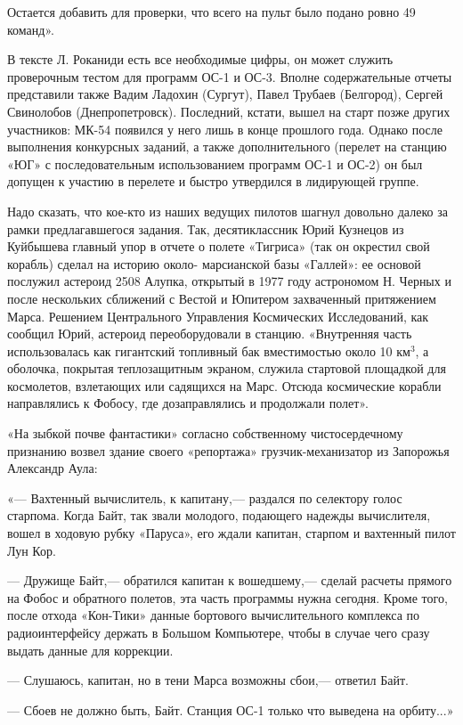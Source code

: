 \documentclass[11pt,a4paper,oneside]{article}
\begin{document}
Остается добавить для проверки, что всего на пульт было подано ровно 49 команд».

В тексте Л. Роканиди есть все необходимые цифры, он может служить проверочным тестом для программ ОС-1 и ОС-3. Вполне содержательные отчеты представили также Вадим Ладохин (Сургут), Павел Трубаев (Белгород), Сергей Свинолобов (Днепропетровск). Последний, кстати, вышел на старт позже других участников: МК-54 появился у него лишь в конце прошлого года. Однако после выполнения конкурсных заданий, а также дополнительного (перелет на станцию «ЮГ» с последовательным использованием программ ОС-1 и ОС-2) он был допущен к участию в перелете и быстро утвердился в лидирующей группе.

Надо сказать, что кое-кто из наших ведущих пилотов шагнул довольно далеко за рамки предлагавшегося задания. Так, десятиклассник Юрий Кузнецов из Куйбышева главный упор в отчете о полете «Тигриса» (так он окрестил свой корабль) сделал на историю около- марсианской базы «Галлей»: ее основой послужил астероид 2508 Алупка, открытый в 1977 году астрономом Н. Черных и после нескольких сближений с Вестой и Юпитером захваченный притяжением Марса. Решением Центрального Управления Космических Исследований, как сообщил Юрий, астероид переоборудовали в станцию. «Внутренняя часть использовалась как гигантский топливный бак вместимостью около 10 км$^{3}$, а оболочка, покрытая теплозащитным экраном, служила стартовой площадкой для космолетов, взлетающих или садящихся на Марс. Отсюда космические корабли направлялись к Фобосу, где дозаправлялись и продолжали полет».

«На зыбкой почве фантастики» согласно собственному чистосердечному признанию возвел здание своего «репортажа» грузчик-механизатор из Запорожья Александр Аула:

«— Вахтенный вычислитель, к капитану,— раздался по селектору голос старпома. Когда Байт, так звали молодого, подающего надежды вычислителя, вошел в ходовую рубку «Паруса», его ждали капитан, старпом и вахтенный пилот Лун Кор.

— Дружище Байт,— обратился капитан к вошедшему,— сделай расчеты прямого на Фобос и обратного полетов, эта часть программы нужна сегодня. Кроме того, после отхода «Кон-Тики» данные бортового вычислительного комплекса по радиоинтерфейсу держать в Большом Компьютере, чтобы в случае чего сразу выдать данные для коррекции.

— Слушаюсь, капитан, но в тени Марса возможны сбои,— ответил Байт.

— Сбоев не должно быть, Байт. Станция ОС-1 только что выведена на орбиту...»
\end{document}
